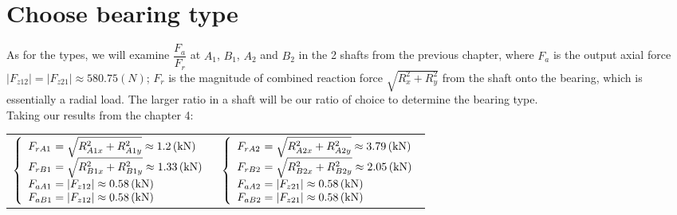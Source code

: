 \section{Choose bearing type}
As for the types, we will examine $  \dfrac{F_a}{F_r}  $ at $ A_1 $, $ B_1 $, $ A_2 $ and $ B_2 $ in the 2 shafts from the previous chapter, where $ F_a $ is the output axial force $ |F_{z12}| = |F_{z21}| \approx 580.75 \unit{(N)} $; $ F_r $ is the magnitude of combined reaction force $ \sqrt{R_x^2+R_y^2} $ from the shaft onto the bearing, which is essentially a radial load. The larger ratio in a shaft will be our ratio of choice to determine the bearing type.\\
Taking our results from the chapter 4: \vskip2mm
{\centering
	\begin{tabular}[ht]{p{7.5cm}p{7.5cm}}
		$
		\left\{ 
		\begin{array}{l@{{} = {}}l}
		F_{rA1} & \sqrt{R_{A1x}^2+R_{A1y}^2}  \approx  1.2\unit{(kN)}\\
		F_{rB1} & \sqrt{R_{B1x}^2+R_{B1y}^2}  \approx  1.33\unit{(kN)}\\
		F_{aA1} & |F_{z12}|  \approx  0.58 \unit{(kN)}\\
		F_{aB1} & |F_{z12}|  \approx  0.58 \unit{(kN)}\\
		\end{array}
		\right.
		$ & $
		\left\{ 
		\begin{array}{l@{{} = {}}l}
		F_{rA2} & \sqrt{R_{A2x}^2+R_{A2y}^2}  \approx  3.79\unit{(kN)}\\
		F_{rB2} & \sqrt{R_{B2x}^2+R_{B2y}^2}  \approx  2.05\unit{(kN)}\\
		F_{aA2} & |F_{z21}|  \approx  0.58 \unit{(kN)}\\
		F_{aB2} & |F_{z21}|  \approx  0.58 \unit{(kN)}\\
		\end{array}
		\right.
		$
\end{tabular}}\vskip2mm


